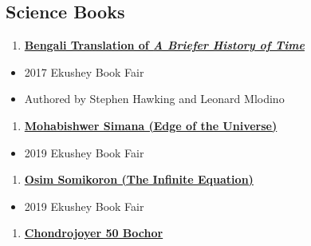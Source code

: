 \documentclass[
]{book}
\providecommand{\tightlist}{%
  \setlength{\itemsep}{0pt}\setlength{\parskip}{0pt}}
\begin{document}
\hypertarget{science-books}{%
\subsection*{Science Books}\label{science-books}}

\begin{enumerate}
\def\labelenumi{\arabic{enumi}.}
\tightlist
\item
  \href{https://www.rokomari.com/book/128479/a-briefer-history-of-time}{\textbf{Bengali Translation of \emph{A Briefer History of Time} }}
\end{enumerate}

\begin{itemize}
\tightlist
\item
  2017 Ekushey Book Fair
\item
  Authored by Stephen Hawking and Leonard Mlodino
\end{itemize}

\begin{enumerate}
\def\labelenumi{\arabic{enumi}.}
\setcounter{enumi}{1}
\tightlist
\item
  \href{https://www.rokomari.com/book/177345/mohabiswer-simana}{\textbf{Mohabishwer Simana (Edge of the Universe)}}
\end{enumerate}

\begin{itemize}
\tightlist
\item
  2019 Ekushey Book Fair
\end{itemize}

\begin{enumerate}
\def\labelenumi{\arabic{enumi}.}
\setcounter{enumi}{2}
\tightlist
\item
  \href{https://www.rokomari.com/book/179175/osim-somikoron}{\textbf{Osim Somikoron (The Infinite Equation)}}
\end{enumerate}

\begin{itemize}
\tightlist
\item
  2019 Ekushey Book Fair
\end{itemize}

\begin{enumerate}
\def\labelenumi{\arabic{enumi}.}
\setcounter{enumi}{3}
\tightlist
\item
  \href{https://www.rokomari.com/book/194398/chandrojoyer-50-bochor}{\textbf{Chondrojoyer 50 Bochor}}
\end{enumerate}
\end{document}
